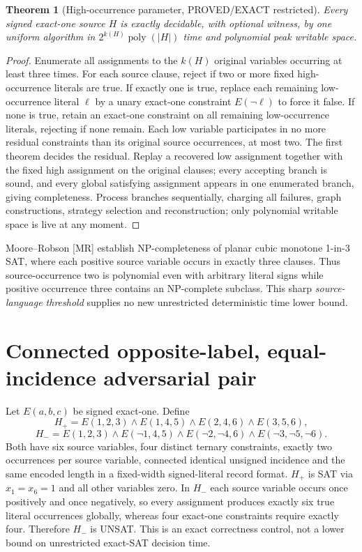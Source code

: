 \documentclass[11pt]{article}
\newtheorem{theorem}{Theorem}
\begin{document}
\begin{theorem}[High-occurrence parameter, PROVED/EXACT restricted]
Every signed exact-one source $H$ is exactly decidable, with optional witness, by one uniform algorithm in $2^{k(H)}\operatorname{poly}(|H|)$ time and polynomial peak writable space.
\end{theorem}
\begin{proof}
Enumerate all assignments to the $k(H)$ original variables occurring at least three times. For each source clause, reject if two or more fixed high-occurrence literals are true. If exactly one is true, replace each remaining low-occurrence literal $\ell$ by a unary exact-one constraint $E(\neg\ell)$ to force it false. If none is true, retain an exact-one constraint on all remaining low-occurrence literals, rejecting if none remain. Each low variable participates in no more residual constraints than its original source occurrences, at most two. The first theorem decides the residual. Replay a recovered low assignment together with the fixed high assignment on the original clauses; every accepting branch is sound, and every global satisfying assignment appears in one enumerated branch, giving completeness. Process branches sequentially, charging all failures, graph constructions, strategy selection and reconstruction; only polynomial writable space is live at any moment.
\end{proof}

Moore--Robson [MR] establish NP-completeness of planar cubic monotone 1-in-3 SAT, where each positive source variable occurs in exactly three clauses. Thus source-occurrence two is polynomial even with arbitrary literal signs while positive occurrence three contains an NP-complete subclass. This sharp \emph{source-language threshold} supplies no new unrestricted deterministic time lower bound.

\section{Connected opposite-label, equal-incidence adversarial pair}
Let $E(a,b,c)$ be signed exact-one. Define
\[
H_+=E(1,2,3)\wedge E(1,4,5)\wedge E(2,4,6)\wedge E(3,5,6),
\]
\[
H_-=E(1,2,3)\wedge E(\neg1,4,5)\wedge
 E(\neg2,\neg4,6)\wedge E(\neg3,\neg5,\neg6).
\]
Both have six source variables, four distinct ternary constraints, exactly two occurrences per source variable, connected identical unsigned incidence and the same encoded length in a fixed-width signed-literal record format. $H_+$ is SAT via $x_1=x_6=1$ and all other variables zero. In $H_-$ each source variable occurs once positively and once negatively, so every assignment produces exactly six true literal occurrences globally, whereas four exact-one constraints require exactly four. Therefore $H_-$ is UNSAT. This is an exact correctness control, not a lower bound on unrestricted exact-SAT decision time.
\end{document}
